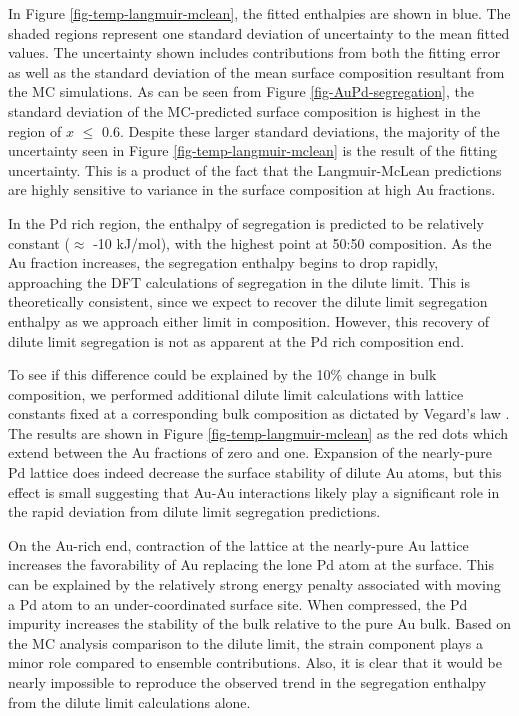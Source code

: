 \documentclass[12pt,oneside]{cmuthesis}
\begin{document}
In Figure \ref{fig-temp-langmuir-mclean}, the fitted enthalpies are shown in blue. The shaded regions represent one standard deviation of uncertainty to the mean fitted values. The uncertainty shown includes contributions from both the fitting error as well as the standard deviation of the mean surface composition resultant from the MC simulations. As can be seen from Figure \ref{fig-AuPd-segregation}, the standard deviation of the MC-predicted surface composition is highest in the region of \(x\) \(\le\) 0.6. Despite these larger standard deviations, the majority of the uncertainty seen in Figure \ref{fig-temp-langmuir-mclean} is the result of the fitting uncertainty. This is a product of the fact that the Langmuir-McLean predictions are highly sensitive to variance in the surface composition at high Au fractions.

In the Pd rich region, the enthalpy of segregation is predicted to be relatively constant (\(\approx\) -10 kJ/mol), with the highest point at 50:50 composition. As the Au fraction increases, the segregation enthalpy begins to drop rapidly, approaching the DFT calculations of segregation in the dilute limit. This is theoretically consistent, since we expect to recover the dilute limit segregation enthalpy as we approach either limit in composition. However, this recovery of dilute limit segregation is not as apparent at the Pd rich composition end.

To see if this difference could be explained by the 10\% change in bulk composition, we performed additional dilute limit calculations with lattice constants fixed at a corresponding bulk composition as dictated by Vegard's law \cite{denton-1991-vegar-law}. The results are shown in Figure \ref{fig-temp-langmuir-mclean} as the red dots which extend between the Au fractions of zero and one. Expansion of the nearly-pure Pd lattice does indeed decrease the surface stability of dilute Au atoms, but this effect is small suggesting that Au-Au interactions likely play a significant role in the rapid deviation from dilute limit segregation predictions.

On the Au-rich end, contraction of the lattice at the nearly-pure Au lattice increases the favorability of Au replacing the lone Pd atom at the surface. This can be explained by the relatively strong energy penalty associated with moving a Pd atom to an under-coordinated surface site. When compressed, the Pd impurity increases the stability of the bulk relative to the pure Au bulk. Based on the MC analysis comparison to the dilute limit, the strain component plays a minor role compared to ensemble contributions. Also, it is clear that it would be nearly impossible to reproduce the observed trend in the segregation enthalpy from the dilute limit calculations alone.
\end{document}
